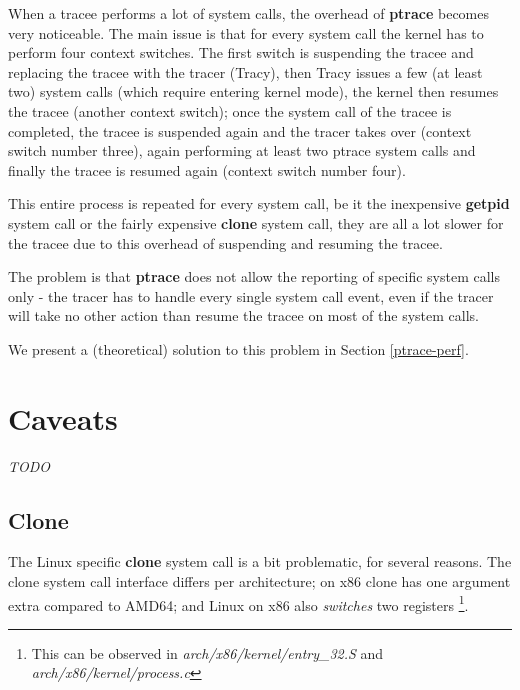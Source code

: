 \documentclass[a4paper, 10pt]{report}
\begin{document}
When a tracee performs a lot of system calls, the overhead of \textbf{ptrace}
becomes very noticeable. The main issue is that for every system call the kernel
has to perform four context switches. The first switch is suspending the tracee
and replacing the tracee with the tracer (Tracy), then Tracy issues a few
(at least two) system calls (which require entering kernel mode),
the kernel then resumes the tracee (another context switch); once the system
call of the tracee is completed, the tracee is suspended again and the tracer
takes over (context switch number three), again performing at least two ptrace
system calls and finally the tracee is resumed again (context switch number four).

This entire process is repeated for every system call, be it the
inexpensive \textbf{getpid} system call or the fairly expensive
\textbf{clone} system call, they are all a lot slower for the tracee
due to this overhead of suspending and resuming the tracee.

The problem is that \textbf{ptrace} does not allow the reporting of specific
system calls only - the tracer has to handle every single system call event,
even if the tracer will take no other action than resume the tracee on most
of the system calls.

We present a (theoretical) solution to this problem in
Section \ref{ptrace-perf}.

\section{Caveats}

\textit{TODO}

\subsection{Clone}

The Linux specific \textbf{clone} system call is a bit problematic, for
several reasons. The clone system call interface differs per architecture;
on x86 clone has one argument extra compared to AMD64; and Linux on x86
also \textit{switches} two registers
\footnote{This can be observed in \textit{arch/x86/kernel/entry\_32.S}
and \textit{arch/x86/kernel/process.c}}.

\end{document}
